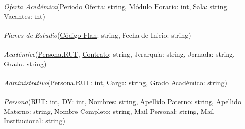 \documentclass[12pt]{article}
\begin{document}
\textit{Oferta Académica}(\underline{Periodo Oferta}: string, Módulo Horario: int, Sala: string, Vacantes: int)\\\\
\textit{Planes de Estudio}(\underline{Código Plan}: string, Fecha de Inicio: string)\\\\
\textit{Académico}(\underline{Persona.RUT}, \underline{Contrato}: string, Jerarquía: string, Jornada: string, Grado: string)\\\\
\textit{Administrativo}(\underline{Persona.RUT}: int, \underline{Cargo}: string, Grado Académico: string)\\\\
\textit{Persona}(\underline{RUT}: int, DV: int, Nombres: string, Apellido Paterno: string, Apellido Materno: string, Nombre Completo: string, Mail Personal: string, Mail Institucional: string)
\end{document}
